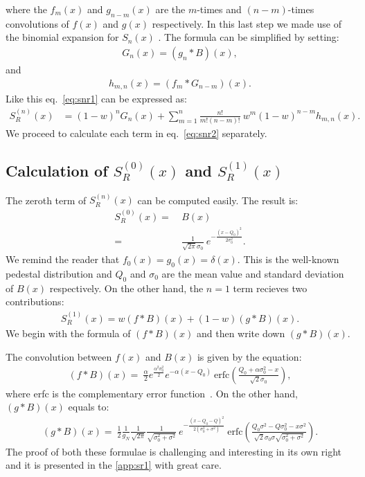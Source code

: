 \documentclass[preprint,12pt]{elsarticle}
\begin{document}
where the $f_m(x)$ and $g_{n-m}(x)$ are the $m$-times and $(n-m)$-times convolutions of $f(x)$ and $g(x)$ respectively. 
In this last step we made use of the binomial expansion for $S_n(x)$ \cite{error}. 
The formula can be simplified by setting:
\begin{align}
G_n(x) = (g_{n} *B )(x), 
\end{align}
and 
\begin{align}
h_{m,n}(x) = (f_{m} * G_{n-m} )(x).  
\end{align}
Like this eq.~\eqref{eq:snr1} can be expressed as:
\begin{align}
S^{(n)}_R(x) & = (1-w)^n G_n(x) + \sum_{m=1}^{n}  \frac{n!}{m!(n-m)!} \ w^m (1-w)^{n-m} h_{m,n}(x). \label{eq:snr2}
\end{align}
We proceed to calculate each term in eq.~\eqref{eq:snr2} separately.  


\subsection{Calculation of $S^{(0)}_R(x)$ and $S^{(1)}_R(x)$}
%

The zeroth term of $S^{(n)}_R(x)$ can be computed easily. 
The result is:
\begin{align}
S^{(0)}_R(x)  = \ & B(x) \nonumber \\
                      = \ & \frac{1}{\sqrt{2\pi}\sigma_0} \ e^{-\frac{(x-Q_0)^2}{2\sigma_0^2}}.
\end{align}
We remind the reader that $f_0(x)=g_0(x)=\delta (x)$. 
This is the well-known pedestal distribution and $Q_0$ and $\sigma_0$ are the mean value and standard deviation of $B(x)$ respectively. 
On the other hand, the $n=1$ term recieves two contributions:
\begin{align}
S^{(1)}_R(x)  = w (f*B)(x) + (1-w)(g*B)(x). 
\end{align}                     
We begin with the formula of $(f*B)(x)$ and then write down $(g*B)(x)$.

The convolution between $f(x)$ and $B(x)$ is given by the equation:
\begin{align}
(f*B)(x)  = \ \frac{\alpha}{2} e^{\frac{\alpha^2\sigma_0^2}{2}} e^{-\alpha (x-Q_0)} \ \text{erfc}\left( \frac{Q_0 + \alpha\sigma_0^2 - x }{\sqrt{2}\sigma_0} \right),
\end{align}  
where erfc is the complementary error function~\cite{error}.
On the other hand, $(g*B)(x)$ equals to:
\begin{align}
(g*B)(x)  = \ \frac{1}{2}  \frac{1}{g_N}  \frac{1}{\sqrt{2\pi}} \frac{1}{\sqrt{\sigma_0^2 + \sigma^2}}   \ e^{ -\frac{ (x-Q_0-Q)^2 }{2(\sigma_0^2 + \sigma^2)}} 
\ \text{erfc}\left(  \frac{ Q_0\sigma^2 -Q\sigma_0^2 -x \sigma^2  }{\sqrt{2} \sigma_0\sigma\sqrt{\sigma_0^2 + \sigma^2} }   \right).
\end{align}  
The proof of both these formulae is challenging and interesting in its own right and it is presented in the \ref{app:sr1} with great care. 
\end{document}
